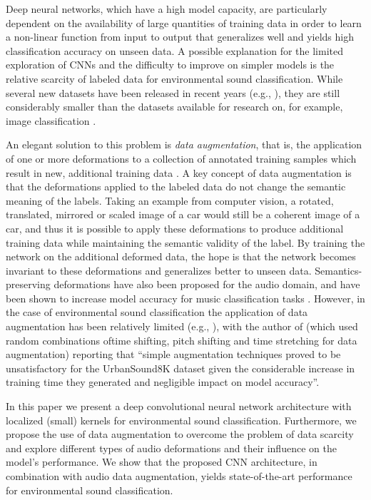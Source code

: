 \documentclass[journal,pdf]{IEEEtran}
\begin{document}
Deep neural networks, which have a high model capacity, are particularly dependent on the availability of large quantities of training data in order to learn a non-linear function from input to output that generalizes well and yields high classification accuracy on unseen data.
A possible explanation for the limited exploration of CNNs and the difficulty to improve on simpler models is the relative scarcity of labeled data for environmental sound classification. While several new datasets have been released in recent years (e.g., \cite{Salamon:UrbanSound:ACMMM:14,Piczak:ESCdataset:ACMMM:15,Mesaros:TUT16dataset:Zenodo:16}), they are still considerably smaller than the datasets available for research on, for example, image classification \cite{Krizhevsky:Imagenet:NIPS:2012}. 

An elegant solution to this problem is \emph{data augmentation}, that is, the application of one or more deformations to a collection of annotated training samples which result in new, additional training data \cite{Simard:CNNBestPractices:ICDAR:03,Krizhevsky:Imagenet:NIPS:2012,McFee:Augmentation:ISMIR:15}. A key concept of data augmentation is that the deformations applied to the labeled data do not change the semantic meaning of the labels. Taking an example from computer vision, a rotated, translated, mirrored or scaled image of a car would still be a coherent image of a car, and thus it is possible to apply these deformations to produce additional training data while maintaining the semantic validity of the label. By training the network on the additional deformed data, the hope is that the network becomes invariant to these deformations and generalizes better to unseen data. Semantics-preserving deformations have also been proposed for the audio domain, and have been shown to increase model accuracy for music classification tasks \cite{McFee:Augmentation:ISMIR:15}. However, in the case of environmental sound classification the application of data augmentation has been relatively limited (e.g., \cite{Piczak:EnvSoundCNN:MLSP:15,Parascandolo:RNNSED:ICASSP:16}), with the author of \cite{Piczak:EnvSoundCNN:MLSP:15} (which used random combinations of\linebreak time shifting, pitch shifting and time stretching for data augmentation) reporting that ``simple augmentation techniques proved to be unsatisfactory for the UrbanSound8K dataset given the considerable increase in training time they generated and negligible impact on model accuracy''.

In this paper we present a deep convolutional neural network architecture 
with localized (small) kernels
for environmental sound classification. Furthermore, we propose the use of data augmentation to overcome the problem of data scarcity and explore different types of audio deformations and their influence on the model's performance. We show that the proposed CNN architecture, in combination with audio data augmentation, yields state-of-the-art performance for environmental sound classification.
\end{document}
